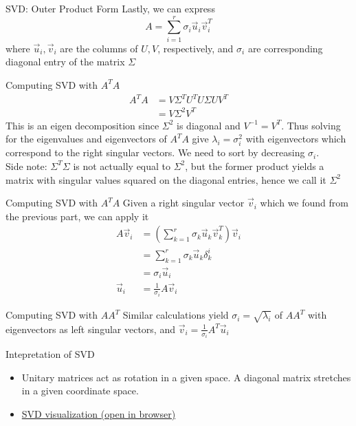 \documentclass{beamer}
\begin{document}
\begin{frame}{SVD: Outer Product Form}
Lastly, we can express
\[ A = \sum_{i = 1}^r \sigma_i \vec{u}_i \vec{v}_i^T \]
where $\vec{u}_i, \vec{v}_i$ are the columns of $U, V$, respectively, and $\sigma_i$ are corresponding diagonal entry of the matrix $\Sigma$
\end{frame}

\begin{frame}{Computing SVD with $A^T A$}
\begin{align*}
A^T A &= V \Sigma^T U^T U \Sigma UV^T \\
&= V \Sigma^2 V^T
\end{align*}
This is an eigen decomposition since $\Sigma^2$ is diagonal and $V^{-1} = V^T$. Thus solving for the eigenvalues and eigenvectors of $A^T A$ give $\lambda_i = \sigma_i^2$ with eigenvectors which correspond to the right singular vectors. We need to sort by decreasing $\sigma_i$. \\

\alert{Side note:} $\Sigma^T \Sigma$ is not actually equal to $\Sigma^2$, but the former product yields a matrix with singular values squared on the diagonal entries, hence we call it $\Sigma^2$
\end{frame}

\begin{frame}{Computing SVD with $A^T A$}
Given a right singular vector $\vec{v}_i$ which we found from the previous part, we can apply it
\begin{align*}
A \vec{v}_i &= \left( \sum_{k = 1}^r \sigma_k \vec{u}_k \vec{v}_k^T \right) \vec{v}_i \\
&= \sum_{k = 1}^r \sigma_k \vec{u}_k \delta_k^i \\
&= \sigma_i \vec{u}_i \\
\vec{u}_i &= \frac{1}{\sigma_i} A \vec{v}_i
\end{align*}
\end{frame}

\begin{frame}{Computing SVD with $A A^T$}
Similar calculations yield $\sigma_i = \sqrt{\lambda_i}$ of $A A^T$ with eigenvectors as left singular vectors, and $\vec{v}_i = \frac{1}{\sigma_i} A^T \vec{u}_i$
\end{frame}

\begin{frame}{Intepretation of SVD}
\begin{itemize}
\item Unitary matrices act as rotation in a given space. A diagonal matrix stretches in a given coordinate space.

\item \href{https://en.wikipedia.org/wiki/File:Singular_value_decomposition.gif}{SVD visualization (open in browser)}
\end{itemize}
\end{frame}
\end{document}
